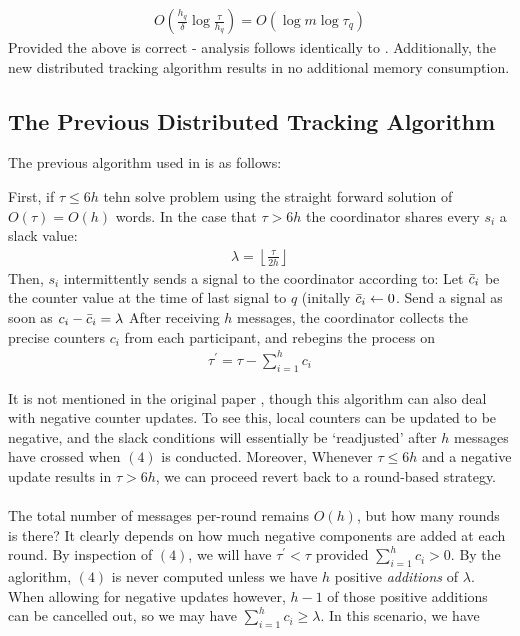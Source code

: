 \documentclass{article}
\begin{document}
\begin{align}
    O\left(\frac{h_q}{\delta}\log \frac{\tau}{h_q}\right) = O(\log m \log \tau_q)
\end{align}
Provided the above is correct - analysis follows identically to \cite{Gan2016}. Additionally, the new distributed tracking algorithm results in no additional memory consumption. 

\newpage
\subsection*{The Previous Distributed Tracking Algorithm}
The previous algorithm used in \cite{Gan2016} is as follows: 

   \begin{mdframed}
First, if $\tau\leq6h$ tehn solve problem using the straight forward solution of $O(\tau) = O(h)$ words. 
    In the case that $\tau > 6h$ the coordinator shares every $s_i$ a slack value: 
    \begin{align}
        \lambda = \left\lfloor \frac{\tau}{2h}\right\rfloor
    \end{align}
    Then, $s_i$ intermittently sends a signal to the coordinator according to: 
    Let $\Bar{c}_i$ be the counter value at the time of last signal to $q$ (initally $\Bar{c}_i\leftarrow0$. Send a signal as soon as $c_i - \Bar{c}_i = \lambda$
    After receiving $h$ messages, the coordinator collects the precise counters $c_i$ from each participant, and rebegins the process on 
    \begin{align}
        \tau^\prime = \tau - \sum_{i=1}^{h}c_i
    \end{align}
\end{mdframed}

It is not mentioned in the original paper \cite{Cormode2011}, though this algorithm can also deal with negative counter updates. To see this, local counters can be updated to be negative, and the slack conditions will essentially be `readjusted' after $h$ messages have crossed when $(4)$ is conducted.  Moreover, Whenever $\tau\leq6h$ and a negative update results in $\tau > 6h$, we can proceed revert back to a round-based strategy. \\
\\
The total number of messages per-round remains $O(h)$, but how many rounds is there? It clearly depends on how much negative components are added at each round. By inspection of $(4)$, we will have $\tau^\prime < \tau$ provided $\sum_{i=1}^{h} c_i > 0$. By the aglorithm, $(4)$ is never computed unless we have $h$ positive \textit{additions} of $\lambda$. When allowing for negative updates however, $h-1$ of those positive additions can be cancelled out, so we may have $\sum_{i=1}^{h}c_i \geq \lambda$. In this scenario, we have 



\newpage

\end{document}
